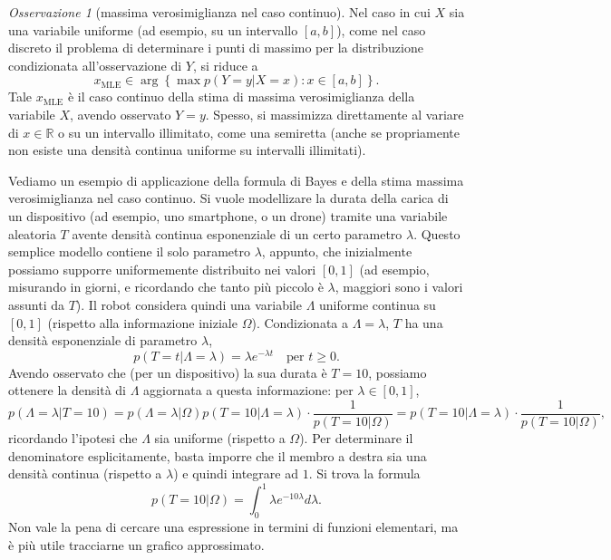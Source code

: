 \documentclass[
  italian,
  letterpaper,
]{book}
\newcommand{\cur}[1]{\left\{ #1 \right\}}
\newcommand{\R}{\mathbb{R}}
\newcommand{\mle}{\operatorname{MLE}}
\theoremstyle{definition}
\theoremstyle{remark}
\newtheorem*{remark}{Osservazione}
\begin{document}
\begin{remark}[massima verosimiglianza nel caso continuo]
Nel caso in cui \(X\) sia una variabile uniforme (ad esempio, su un
intervallo \([a,b]\)), come nel caso discreto il problema di determinare
i punti di massimo per la distribuzione condizionata all'osservazione di
\(Y\), si riduce a
\[ x_{\mle} \in \operatorname{arg}\cur{ \max p(Y=y | X=x): x \in [a,b]}.\]
Tale \(x_{\mle}\) è il caso continuo della stima di massima
verosimiglianza della variabile \(X\), avendo osservato \(Y=y\). Spesso,
si massimizza direttamente al variare di \(x \in \R\) o su un intervallo
illimitato, come una semiretta (anche se propriamente non esiste una
densità continua uniforme su intervalli illimitati).
\end{remark}

Vediamo un esempio di applicazione della formula di Bayes e della stima
massima verosimiglianza nel caso continuo. Si vuole modellizare la
durata della carica di un dispositivo (ad esempio, uno smartphone, o un
drone) tramite una variabile aleatoria \(T\) avente densità continua
esponenziale di un certo parametro \(\lambda\). Questo semplice modello
contiene il solo parametro \(\lambda\), appunto, che inizialmente
possiamo supporre uniformemente distribuito nei valori \([0,1]\) (ad
esempio, misurando in giorni, e ricordando che tanto più piccolo è
\(\lambda\), maggiori sono i valori assunti da \(T\)). Il robot
considera quindi una variabile \(\Lambda\) uniforme continua su
\([0,1]\) (rispetto alla informazione iniziale \(\Omega\)). Condizionata
a \(\Lambda= \lambda\), \(T\) ha una densità esponenziale di parametro
\(\lambda\),
\[p(T = t | \Lambda = \lambda) = \lambda e^{-\lambda t } \quad \text{per $t \ge 0$.}\]
Avendo osservato che (per un dispositivo) la sua durata è \(T=10\),
possiamo ottenere la densità di \(\Lambda\) aggiornata a questa
informazione: per \(\lambda \in [0,1]\),
\[ p(\Lambda = \lambda| T = 10) = p(\Lambda = \lambda|\Omega) p(T=10 | \Lambda = \lambda) \cdot \frac{1}{p(T=10|\Omega)} = p(T=10 | \Lambda = \lambda) \cdot \frac{1}{p(T=10|\Omega)},\]
ricordando l'ipotesi che \(\Lambda\) sia uniforme (rispetto a
\(\Omega\)). Per determinare il denominatore esplicitamente, basta
imporre che il membro a destra sia una densità continua (rispetto a
\(\lambda\)) e quindi integrare ad \(1\). Si trova la formula
\[ p(T=10|\Omega) = \int_0^1  \lambda e^{- 10 \lambda } d \lambda.\] Non
vale la pena di cercare una espressione in termini di funzioni
elementari, ma è più utile tracciarne un grafico approssimato.
\end{document}

